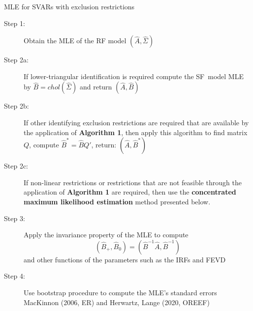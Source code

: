 \documentclass[notes,blackandwhite,mathsans,usenames,dvipsnames]{beamer}
\begin{document}
\begin{frame}{MLE for SVARs with exclusion restrictions}
\small
\begin{description}
\item[Step 1:] {\color{mcxs2}Obtain the MLE of the RF model} $\left(\widehat{A},\widehat{\Sigma}\right)$
\item[Step 2a:] {\color{mcxs2}If lower-triangular identification is required compute the SF~model MLE by} $\widehat{B}=chol(\widehat\Sigma)$ {\color{mcxs2}and  return} $\left(\widehat{A},\widehat{B}\right)$
\item[Step 2b:] {\color{mcxs2}If other identifying exclusion restrictions are required that are available by the application of} \textbf{Algorithm 1}{\color{mcxs2}, then apply this algorithm to find matrix} $Q${\color{mcxs2}, compute} $\widehat{B}^*=\widehat{B}Q' ${\color{mcxs2}, return:} $\left(\widehat{A},\widehat{B}^*\right)$
\item[Step 2c:] {\color{mcxs2}If non-linear restrictions or restrictions that are not feasible through the application of} \textbf{Algorithm 1} {\color{mcxs2}are required, then use the} \textbf{concentrated maximum likelihood estimation} {\color{mcxs2}method presented below.}
\item[Step 3:] {\color{mcxs2}Apply the invariance property of the MLE to compute} $$\left( \widehat{B}_+, \widehat{B}_0 \right)=\left( \widehat{B}^{-1}\widehat{A}, \widehat{B}^{-1} \right)$$
{\color{mcxs2}and other functions of the parameters such as the IRFs and FEVD}
\item[Step 4:] {\color{mcxs2}Use bootstrap procedure to compute the MLE's standard errors\\ \footnotesize
MacKinnon (2006, ER) and Herwartz, Lange (2020, OREEF)}
\end{description}

\end{frame}







%
%
%
\end{document}
